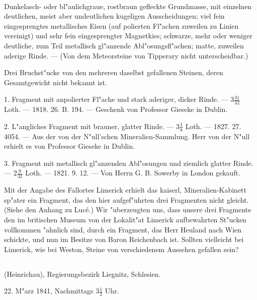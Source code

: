 \documentclass[a4paper, 11pt, oneside, polutonikogreek, german]{article}
\begin{document}
\paragraph{}
Dunkelasch- oder bl"aulichgraue, rostbraun gefleckte Grundmasse, mit einzelnen deutlichen, meist aber undeutlichen kugeligen Ausscheidungen; viel fein eingesprengtes metallisches Eisen (auf polierten Fl"achen zuweilen zu Linien vereinigt) und sehr fein eingesprengter Magnetkies; schwarze, mehr oder weniger deutliche, zum Teil metallisch gl"anzende Abl"osungsfl"achen; matte, zuweilen aderige Rinde. --- (Von dem Meteorsteine von Tipperary nicht unterscheidbar.)

Drei Bruchst"ucke von den mehreren daselbst gefallenen Steinen, deren Gesamtgewicht nicht bekannt ist.

1. Fragment mit anpolierter Fl"ache und stark aderiger, dicker Rinde. --- $3\frac{31}{32}$ Loth. --- 1818. 26. B. 194. --- Geschenk von Professor Gieseke in Dublin.

2. L"angliches Fragment mit brauner, glatter Rinde. --- $3\frac{1}{8}$ Loth. --- 1827. 27. 4054. --- Aus der von der N"ull'schen Mineralien-Sammlung. Herr von der N"ull erhielt es von Professor Gieseke in Dublin.

3. Fragment mit metallisch gl"anzenden Abl"osungen und ziemlich glatter Rinde. --- $2\frac{9}{32}$ Loth. --- 1821. 9. 12. --- Von Herrn G. B. Sowerby in London gekauft.

\setlength{\leftskip}{10mm}
\setlength{\parindent}{0pt}

{\footnotesize Mit der Angabe des Fallortes Limerick erhielt das kaiserl, Mineralien-Kabinett sp"ater ein Fragment, das den hier aufgef"uhrten drei Fragmenten nicht gleicht. (Siehe den Anhang zu Lucé.) Wir "uberzeugten uns, dass unsere drei Fragmente den im britischen Museum von der Lokalit"at Limerick aufbewahrten St"ucken vollkommen "ahnlich sind, durch ein Fragment, das Herr Heuland nach Wien schickte, und nun im Besitze von Baron Reichenbach ist. Sollten vielleicht bei Limerick, wie bei Weston, Steine von verschiedenem Aussehen gefallen sein?}

\setlength{\leftskip}{0pt}
\setlength{\parindent}{20pt}

\subsection{}
\begin{center}

(Heinrichau), Regierungsbezirk Liegnitz, Schlesien.

22. M"arz 1841, Nachmittags $3\frac{1}{2}$ Uhr.
\end{center}
\end{document}
